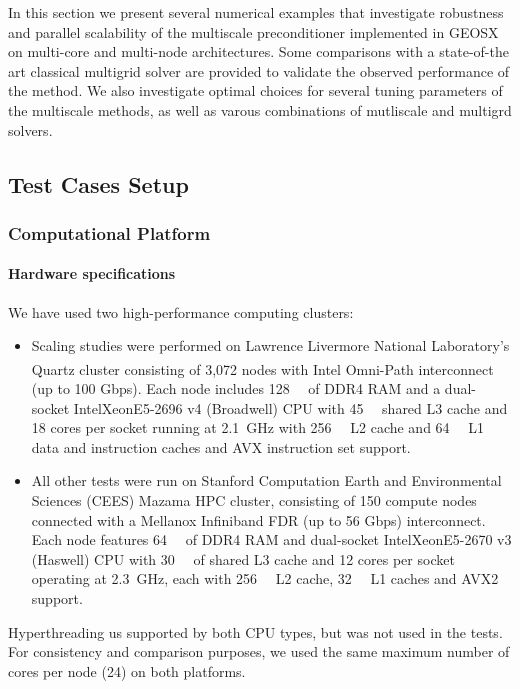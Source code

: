 In this section we present several numerical examples that investigate robustness and parallel scalability of the multiscale preconditioner implemented in GEOSX on multi-core and multi-node architectures.   Some comparisons with a state-of-the art classical multigrid solver are provided to validate the observed performance of the method.   We also investigate optimal choices for several tuning parameters of the multiscale methods, as well as varous combinations of mutliscale and multigrd solvers.

\subsection{Test Cases Setup}

\subsubsection{Computational Platform}

\paragraph{Hardware specifications} 
We have used two high-performance computing clusters:
\begin{itemize}
\item Scaling studies were performed on Lawrence Livermore National Laboratory's Quartz cluster consisting of 3,072 nodes with Intel\textsuperscript{\tiny\textregistered} Omni-Path interconnect (up to 100 Gbps).   Each node includes \qty{128}{\mega\byte} of DDR4 RAM and a dual-socket Intel\Registered Xeon\Registered E5-2696 v4 (Broadwell) CPU with \qty{45}{\mega\byte} shared L3 cache and 18 cores per socket running at \qty{2.1}{\GHz} with \qty{256}{\kilo\byte} L2 cache and \qty{64}{\kilo\byte} L1 data and instruction caches and AVX instruction set support.
\item All other tests were run on Stanford Computation Earth and Environmental Sciences (CEES) Mazama HPC cluster, consisting of 150 compute nodes connected with a Mellanox Infiniband FDR (up to 56 Gbps) interconnect.   Each node features \qty{64}{\giga\byte} of DDR4 RAM and dual-socket Intel\Registered Xeon\Registered E5-2670 v3 (Haswell) CPU with \qty{30}{\mega\byte} of shared L3 cache and 12 cores per socket operating at \qty{2.3}{\GHz}, each with \qty{256}{\kilo\byte} L2 cache, \qty{32}{\kilo\byte} L1 caches and AVX2 support.
\end{itemize}
Hyperthreading us supported by both CPU types, but was not used in the tests.   For consistency and comparison purposes, we used the same maximum number of cores per node (24) on both platforms.

